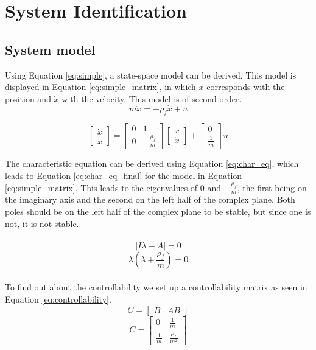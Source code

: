 \documentclass[final]{scrreprt} %
\begin{document}
\chapter{System Identification}

\section*{System model}
Using Equation \ref{eq:simple}, a state-space model can be derived.
This model is displayed in Equation \ref{eq:simple_matrix}, in which $x$ corresponds with the position and $\dot{x}$ with the velocity.
This model is of second order.
\begin{equation}
	m \ddot{x} = -\rho_f \dot{x} + u
	\label{eq:simple}
\end{equation}

\begin{equation}
	\begin{bmatrix}
		\dot{x} \\
		\ddot{x}
	\end{bmatrix} =
	\begin{bmatrix}
		0 & 1 \\
		0 & -\frac{\rho_f}{m}
	\end{bmatrix}
	\begin{bmatrix}
		x \\
		\dot{x}
	\end{bmatrix} +
	\begin{bmatrix}
		0 \\
		\frac{1}{m}
	\end{bmatrix}
	u
	\label{eq:simple_matrix}
\end{equation}

The characteristic equation can be derived using Equation \ref{eq:char_eq}, which leads to Equation \ref{eq:char_eq_final} for the model in Equation \ref{eq:simple_matrix}.
This leads to the eigenvalues of $0$ and $-\frac{\rho_f}{m}$, the first being on the imaginary axis and the second on the left half of the complex plane.
Both poles should be on the left half of the complex plane to be stable, but since one is not, it is not stable.
\\ \\
\begin{equation}
	\left| I \lambda - A \right| = 0
	\label{eq:char_eq}
\end{equation}
\begin{equation}
	\lambda(\lambda + \frac{\rho_f}{m}) = 0
	\label{eq:char_eq_final}
\end{equation}
\\
To find out about the controllability we set up a controllability matrix as seen in Equation \ref{eq:controllability}.
\begin{equation}
C =
\begin{bmatrix}
B & AB
\end{bmatrix}
\end{equation}
\begin{equation}
C =
\begin{bmatrix}
0 & \frac{1}{m}\\
\frac{1}{m} & \frac{\rho_f}{m^2}
\end{bmatrix}\label{eq:controllability}
\end{equation}
\end{document}
